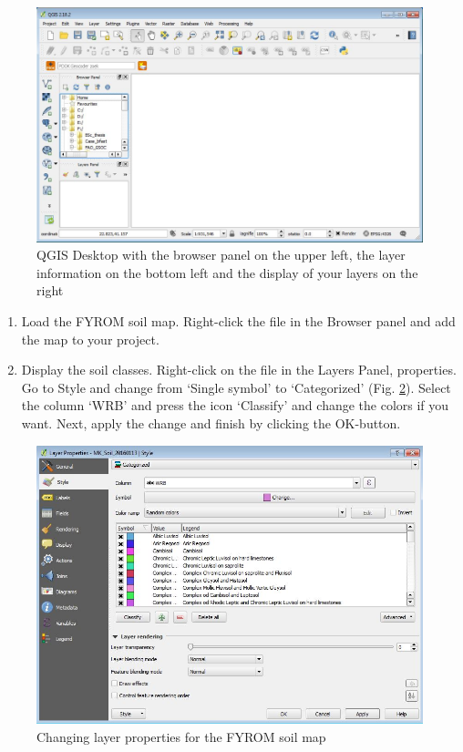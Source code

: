 \documentclass[10pt,b5paper,]{book}
\providecommand{\tightlist}{%
  \setlength{\itemsep}{0pt}\setlength{\parskip}{0pt}}
\theoremstyle{definition}
\theoremstyle{definition}
\theoremstyle{definition}
\theoremstyle{remark}
\begin{document}
\begin{figure}

{\centering \includegraphics[width=0.8\linewidth]{images/Conv_upscaling1} 

}

\caption{QGIS Desktop with the browser panel on the upper left, the layer information on the bottom left and the display of your layers on the right}\label{fig:qgis}
\end{figure}

\begin{enumerate}
\def\labelenumi{\arabic{enumi}.}
\setcounter{enumi}{3}
\tightlist
\item
  Load the FYROM soil map. Right-click the file in the Browser panel and
  add the map to your project.
\item
  Display the soil classes. Right-click on the file in the Layers Panel,
  properties. Go to Style and change from `Single symbol' to
  `Categorized' (Fig. \ref{fig:layerprop}). Select the column `WRB' and
  press the icon `Classify' and change the colors if you want. Next,
  apply the change and finish by clicking the OK-button.
\end{enumerate}

\begin{figure}

{\centering \includegraphics[width=0.8\linewidth]{images/Conv_upscaling2} 

}

\caption{Changing layer properties for the FYROM soil map}\label{fig:layerprop}
\end{figure}
\end{document}
